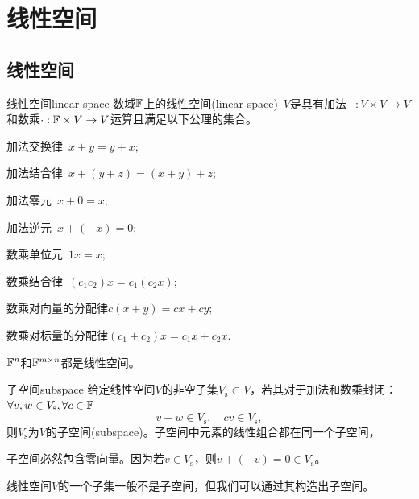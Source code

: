 \chapter{线性空间}
\section{线性空间}
\begin{definition}{线性空间}{linear space}
	数域$\mathbb{F}$上的线性空间(linear space)~$V$是具有加法$+:V \times V \to V$和数乘$\cdot :\mathbb{F} \times V \to V$运算且满足以下公理的集合。
	\begin{compactenum}
		\item 加法交换律\qqqquad\quad~$x + y = y + x;$
		\item 加法结合律\qqqquad\quad~$x + (y + z) = (x + y) + z;$
		\item 加法零元\qqqquad\qquad~$x + 0 = x;$
		\item 加法逆元\qqqquad\qquad~$x + (-x) = 0;$
		\item 数乘单位元\qqqquad\quad~$1x = x;$
		\item 数乘结合律\qqqquad\quad~$(c_1c_2)x = c_1(c_2x);$
		\item 数乘对向量的分配律\quad$c(x + y) = cx + cy;$
		\item 数乘对标量的分配律\quad$(c_1 + c_2)x = c_1x + c_2x.$
	\end{compactenum}
\end{definition}

\begin{example}
	{}{}
	$\mathbb{F}^n$和$\mathbb{F}^{m\times n}$都是线性空间。
\end{example}

\begin{definition}{子空间}{subspace}
	给定线性空间$V$的非空子集$V_\mathrm s \subset V$，若其对于加法和数乘封闭：$\forall v,w \in V_\mathrm s,\forall c \in \mathbb{F}$
	\begin{equation}\label{eq:la-subspace-closure}
		v + w \in V_\mathrm s,\quad cv \in V_\mathrm s,
	\end{equation}
	则$V_\mathrm s$为$V$的子空间(subspace)。子空间中元素的线性组合都在同一个子空间，
\end{definition}

\begin{corollary}
	子空间必然包含零向量。因为若$v \in V_\mathrm s$，则$v + (-v) = 0 \in V_\mathrm s$。
\end{corollary}

\begin{remark}
	线性空间$V$的一个子集一般不是子空间，但我们可以通过其构造出子空间。
\end{remark}

